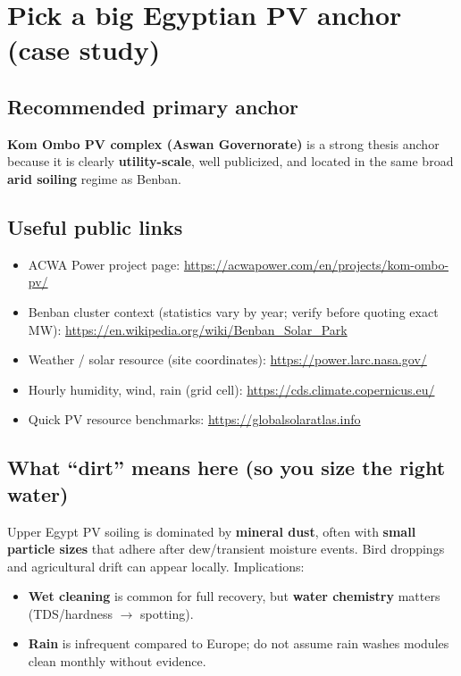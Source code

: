 \documentclass[11pt,a4paper]{article}
\begin{document}
\section{Pick a big Egyptian PV anchor (case study)}
\subsection{Recommended primary anchor}
\textbf{Kom Ombo PV complex (Aswan Governorate)} is a strong thesis anchor because it is clearly \textbf{utility-scale}, well publicized, and located in the same broad \textbf{arid soiling} regime as Benban.

\subsection{Useful public links}
\begin{itemize}[leftmargin=*]
  \item ACWA Power project page: \url{https://acwapower.com/en/projects/kom-ombo-pv/}
  \item Benban cluster context (statistics vary by year; verify before quoting exact MW): \url{https://en.wikipedia.org/wiki/Benban_Solar_Park}
  \item Weather / solar resource (site coordinates): \url{https://power.larc.nasa.gov/}
  \item Hourly humidity, wind, rain (grid cell): \url{https://cds.climate.copernicus.eu/}
  \item Quick PV resource benchmarks: \url{https://globalsolaratlas.info}
\end{itemize}

\subsection{What ``dirt'' means here (so you size the right water)}
Upper Egypt PV soiling is dominated by \textbf{mineral dust}, often with \textbf{small particle sizes} that adhere after dew/transient moisture events. Bird droppings and agricultural drift can appear locally. Implications:
\begin{itemize}[nosep]
  \item \textbf{Wet cleaning} is common for full recovery, but \textbf{water chemistry} matters (TDS/hardness $\rightarrow$ spotting).
  \item \textbf{Rain} is infrequent compared to Europe; do not assume rain washes modules clean monthly without evidence.
\end{itemize}
\end{document}
